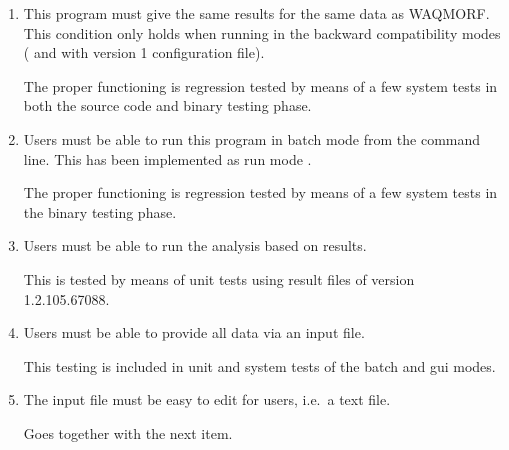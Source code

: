 \begin{enumerate}
\item \begin{requirement}
This program must give the same results for the same data as WAQMORF.
This condition only holds when running in the backward compatibility modes ( and  with version 1 configuration file).
\end{requirement}
\begin{testmethod}
The proper functioning is regression tested by means of a few system tests in both the source code and binary testing phase.
\end{testmethod}

\item \begin{requirement}
Users must be able to run this program in batch mode from the command line.
This has been implemented as run mode .
\end{requirement}
\begin{testmethod}
The proper functioning is regression tested by means of a few system tests in the binary testing phase.
\end{testmethod}

\item \begin{requirement}
Users must be able to run the analysis based on \dflowfm results.
\end{requirement}
\begin{testmethod}
This is tested by means of unit tests using result files of \dflowfm version 1.2.105.67088.
\end{testmethod}

\item \begin{requirement}
Users must be able to provide all data via an input file.
\end{requirement}
\begin{testmethod}
This testing is included in unit and system tests of the batch and gui modes.
\end{testmethod}

\item \begin{requirement}
The input file must be easy to edit for users, i.e.~a text file.
\end{requirement}
\begin{testmethod}
Goes together with the next item.
\end{testmethod}


\end{enumerate}
